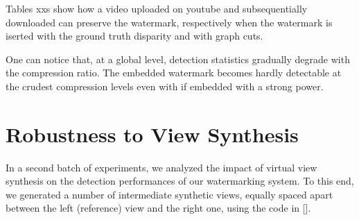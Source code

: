 Tables xxs show how a video uploaded on youtube and subsequentially downloaded can preserve the watermark, respectively when the watermark is iserted with the ground truth disparity and with graph cuts.\newline
 
 
 \begin{table}[htbp]
  \label{Tab:ytgt}
  \begin{center}
  \caption{}
  \end{center}
  \end{table}
 
\begin{table}[htbp]
 \label{Tab:ytkz}
 \begin{center}
 \caption{}
 \end{center}
 \end{table}


One can notice that, at a global level, detection  statistics gradually degrade with the compression ratio. The embedded watermark becomes hardly detectable at the crudest compression levels even with if embedded with a strong power. 
 
\section{Robustness to View Synthesis}

In a second batch of experiments, we analyzed the impact of virtual view synthesis on the detection performances of our watermarking system. To this end, we generated a number of intermediate synthetic views, equally spaced apart between the left (reference) view and the right one, using the code in [].\newline

